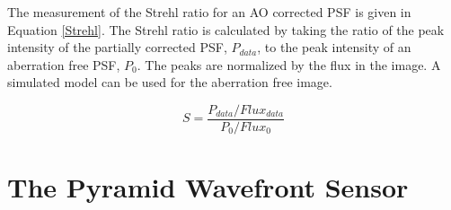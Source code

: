The measurement of the Strehl ratio for an AO corrected PSF is given in Equation \ref{Strehl}. The Strehl ratio is calculated by taking the ratio of the peak intensity of the partially corrected PSF, $P_{data}$,  to the peak intensity of an aberration free PSF, $P_0$. The peaks are normalized by the flux in the image. A simulated model can be used for the aberration free image. 

\begin{equation}
    S=\frac{P_{data}/Flux_{data}}{P_{0}/Flux_{0}}
    \label{Strehl}
\end{equation}








\section{The Pyramid Wavefront Sensor}


